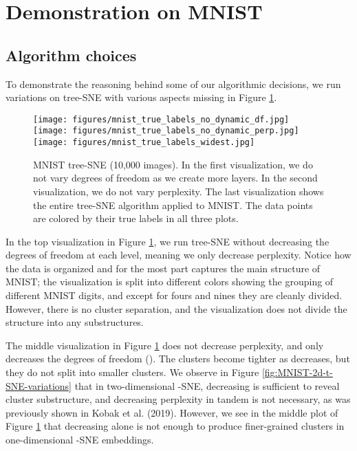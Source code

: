 \documentclass{article}
\begin{document}
\section{Demonstration on MNIST}

\subsection{Algorithm choices}

To demonstrate the reasoning behind some of our algorithmic decisions, we run variations on tree-SNE with various aspects missing in Figure \ref{fig:MNIST-tree-SNE-variations}. 

\begin{figure}[H]
    \centering
    \captionsetup{width=.9\linewidth}
    \texttt{[image: figures/mnist\_true\_labels\_no\_dynamic\_df.jpg]}
    \texttt{[image: figures/mnist\_true\_labels\_no\_dynamic\_perp.jpg]}
    \texttt{[image: figures/mnist\_true\_labels\_widest.jpg]}
    \caption{MNIST tree-SNE (10,000 images). In the first visualization, we do not vary degrees of freedom as we create more layers. In the second visualization, we do not vary perplexity. The last visualization shows the entire tree-SNE algorithm applied to MNIST. The data points are colored by their true labels in all three plots.}
    \label{fig:MNIST-tree-SNE-variations}
\end{figure}

In the top visualization in Figure \ref{fig:MNIST-tree-SNE-variations}, we run tree-SNE without decreasing the degrees of freedom at each level, meaning we only decrease perplexity. Notice how the data is organized and for the most part captures the main structure of MNIST; the visualization is split into different colors showing the grouping of different MNIST digits, and except for fours and nines they are cleanly divided. However, there is no cluster separation, and the visualization does not divide the structure into any substructures. 

The middle visualization in Figure \ref{fig:MNIST-tree-SNE-variations} does not decrease perplexity, and only decreases the degrees of freedom (). The clusters become tighter as  decreases, but they do not split into smaller clusters. We observe in Figure \ref{fig:MNIST-2d-t-SNE-variations} that in two-dimensional -SNE, decreasing  is sufficient to reveal cluster substructure, and decreasing perplexity in tandem is not necessary, as was previously shown in Kobak et al. (2019). However, we see in the middle plot of Figure \ref{fig:MNIST-tree-SNE-variations} that decreasing  alone is not enough to produce finer-grained clusters in one-dimensional -SNE embeddings. 
\end{document}
